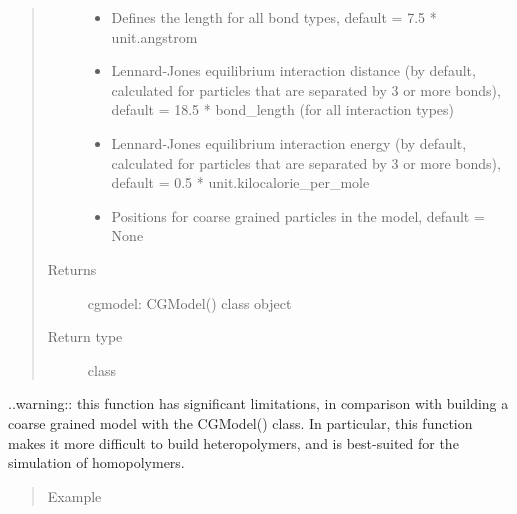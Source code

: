 \documentclass[letterpaper,12pt,english,openany,oneside]{sphinxmanual}
\begin{document}
\begin{fulllineitems}
\begin{quote}
\begin{description}
\begin{itemize}
\item {} 
 \textendash{} Defines the length for all bond types, default = 7.5 * unit.angstrom

\item {} 
 \textendash{} Lennard-Jones equilibrium interaction distance (by default, calculated for particles that are separated by 3 or more bonds), default = 18.5 * bond\_length (for all interaction types)

\item {} 
 \textendash{} Lennard-Jones equilibrium interaction energy (by default, calculated for particles that are separated by 3 or more bonds), default = 0.5 * unit.kilocalorie\_per\_mole

\item {} 
 \textendash{} Positions for coarse grained particles in the model, default = None

\end{itemize}

\item[{Returns}] \leavevmode
cgmodel: CGModel() class object

\item[{Return type}] \leavevmode
class

\end{description}\end{quote}

..warning:: this function has significant limitations, in comparison with building a coarse grained model with the CGModel() class.  In particular, this function makes it more difficult to build heteropolymers, and is best-suited for the simulation of homopolymers.
\begin{quote}\begin{description}
\item[{Example}] \leavevmode
\end{description}\end{quote}


\end{fulllineitems}
\end{document}
